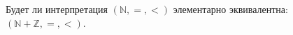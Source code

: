 Будет ли интерпретация $(\mathbb{N}, =, <)$ элементарно эквивалентна:
$(\mathbb{N} + \mathbb{Z}, =, <)$.
